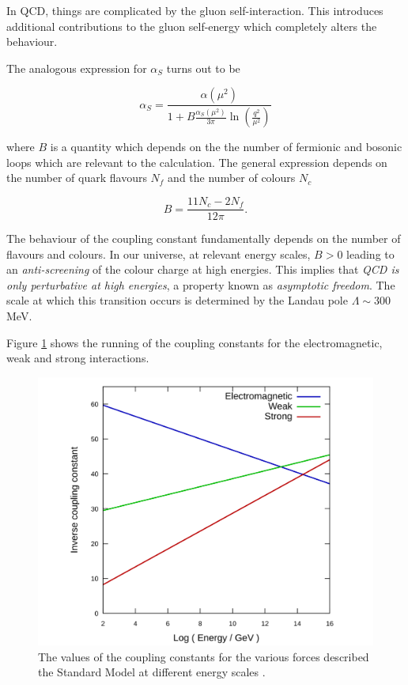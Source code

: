 \documentclass[10pt,a4paper]{book}
\begin{document}
In QCD, things are complicated by the gluon self-interaction. This introduces additional contributions to the gluon self-energy which completely alters the behaviour. 

The analogous expression for $\alpha_S$ turns out to be

\begin{equation}
    \alpha_S = \frac{\alpha(\mu^2)}{1 + B\frac{\alpha_S(\mu^2)}{3\pi}\ln\left(\frac{q^2}{\mu^2}\right)}
\label{qcd running}
\end{equation}

where $B$ is a quantity which depends on the the number of fermionic and bosonic loops which are relevant to the calculation. The general expression depends on the number of quark flavours $N_f$ and the number of colours $N_c$

\begin{equation}
    B = \frac{11N_c - 2N_f}{12\pi}.
\end{equation}

The behaviour of the coupling constant fundamentally depends on the number of flavours and colours. In our universe, at relevant energy scales, $B > 0$ leading to an \emph{anti-screening} of the colour charge at high energies. This implies that \emph{QCD is only perturbative at high energies}, a property known as \emph{asymptotic freedom}. The scale at which this transition occurs is determined by the Landau pole $\Lambda \sim 300 $ MeV. 

Figure \ref{running} shows the running of the coupling constants for the electromagnetic, weak and strong interactions. 

\begin{figure}
    \centering
    \includegraphics[width=0.75\linewidth]{theory chapter/Running_coupling_constants.png}
    \caption{The values of the coupling constants for the various forces described the Standard Model at different energy scales \cite{wiki:running}.}
    \label{running}
\end{figure}
\end{document}
